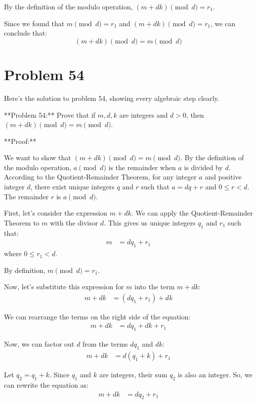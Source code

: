 \documentclass{article}
\begin{document}
By the definition of the modulo operation, $(m + dk) \pmod{d} = r_1$.

Since we found that $m \pmod{d} = r_1$ and $(m + dk) \pmod{d} = r_1$, we can conclude that:
$$
(m + dk) \pmod{d} = m \pmod{d}
$$

\newpage

\section*{Problem 54}
Here's the solution to problem 54, showing every algebraic step clearly.

**Problem 54:** Prove that if $m, d, k$ are integers and $d > 0$, then $(m + dk) \pmod d = m \pmod d$.

**Proof:**

We want to show that $(m + dk) \pmod d = m \pmod d$.
By the definition of the modulo operation, $a \pmod d$ is the remainder when $a$ is divided by $d$.
According to the Quotient-Remainder Theorem, for any integer $a$ and positive integer $d$, there exist unique integers $q$ and $r$ such that $a = dq + r$ and $0 \leq r < d$. The remainder $r$ is $a \pmod d$.

First, let's consider the expression $m + dk$.
We can apply the Quotient-Remainder Theorem to $m$ with the divisor $d$.
This gives us unique integers $q_1$ and $r_1$ such that:
\begin{align*} m &= dq_1 + r_1 \end{align*}
where $0 \leq r_1 < d$.

By definition, $m \pmod d = r_1$.

Now, let's substitute this expression for $m$ into the term $m + dk$:
\begin{align*} m + dk &= (dq_1 + r_1) + dk \end{align*}

We can rearrange the terms on the right side of the equation:
\begin{align*} m + dk &= dq_1 + dk + r_1 \end{align*}

Now, we can factor out $d$ from the terms $dq_1$ and $dk$:
\begin{align*} m + dk &= d(q_1 + k) + r_1 \end{align*}

Let $q_2 = q_1 + k$. Since $q_1$ and $k$ are integers, their sum $q_2$ is also an integer.
So, we can rewrite the equation as:
\begin{align*} m + dk &= dq_2 + r_1 \end{align*}
\end{document}
